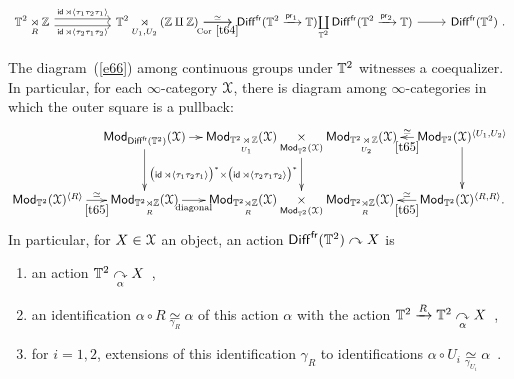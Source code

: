 \begin{equation} \label{e66}
\small{
\begin{tikzcd}
\TT^2  \underset{R}\rtimes \ZZ \arrow[rr, yshift=0.7ex, "\id \rtimes \lag \tau_{1} \tau_{2} \tau_{1}\rag"] \arrow[swap, rr, yshift=-0.7ex, "\id \rtimes \lag \tau_{2} \tau_{1} \tau_{2}\rag"]
&
&
\TT^2 \underset{U_1,U_2} \rtimes (\ZZ \amalg \ZZ)
\arrow[r, "\simeq"]
\arrow[swap, r, "\rm Cor~\ref{t64}"]
&
\Diff^{\fr}(\TT^{2} \xra{\pr_1} \TT)
\underset{\TT^2}
\coprod
\Diff^{\fr}(\TT^{2} \xra{\pr_2} \TT)
\arrow[r]
&
\Diff^{\fr}(\TT^2)
~.
\end{tikzcd}
}
\end{equation}




\begin{cor}
\label{t49}
The diagram~(\ref{e66}) among continuous groups under $\mathbb T^2$
witnesses a coequalizer.
In particular, for each $\infty$-category $\mathcal X$, there is diagram among $\infty$-categories in which the outer square is a pullback:
\[
\xymatrix@C=1em{
&
\Mod_{\Diff^{\fr}(\TT^2)}(\cX)
\ar[r]
\ar[d]
&
\Mod_{\TT^2\underset{U_1} \rtimes  \ZZ }(\cX)
\underset{\Mod_{\TT^2}(\cX)}\times
\Mod_{\TT^2 \underset{U_2} \rtimes \ZZ}(\cX)
\ar[d]_-{\bigl( \id \rtimes \lag \tau_{1} \tau_{2} \tau_{1}\rag \bigr)^\ast \times \bigl( \id \rtimes \lag \tau_{2} \tau_{1} \tau_{2}\rag \bigr)^\ast}
&
\Mod_{\TT^2}(\cX)^{\lag U_1 , U_2 \rag}
\ar[d]
\ar[l]_-{\simeq}^-{\ref{t65}}
\\
\Mod_{\TT^2}(\cX)^{\lag R \rag}
\ar[r]^-{\simeq}_-{\ref{t65}}
&
\Mod_{\TT^2 \underset{R} \rtimes \ZZ }(\cX)
\ar[r]_-{\rm diagonal}
&
\Mod_{\TT^2 \underset{R} \rtimes \ZZ}(\cX)
\underset{\Mod_{\TT^2}(\cX)}\times
\Mod_{\TT^2 \underset{R} \rtimes \ZZ}(\cX)
&
\Mod_{\TT^2}(\cX)^{\lag R , R \rag}
\ar[l]_-{\simeq}^-{\ref{t65}}
.
}
\]
In particular, for $X\in \mathcal X$ an object, an action $\operatorname{{\sf Diff}}^{\operatorname{\sf fr}}(\mathbb T^2) \curvearrowright X$ is 
\begin{enumerate}
\item
an action $\mathbb T^2 \underset{\alpha}{\curvearrowright} X$~,

\item
an identification $\alpha \circ R \underset{\gamma_R}\simeq \alpha$ of this action $\alpha$ with the action $\mathbb T^2 \xrightarrow{R} \mathbb T^2 \underset{\alpha}{\curvearrowright} X$~,

\item
for $i=1,2$, extensions of this identification $\gamma_R$ to identifications $\alpha \circ U_i \underset{\gamma_{U_i}}\simeq \alpha$~.  


\end{enumerate}


\end{cor}




















